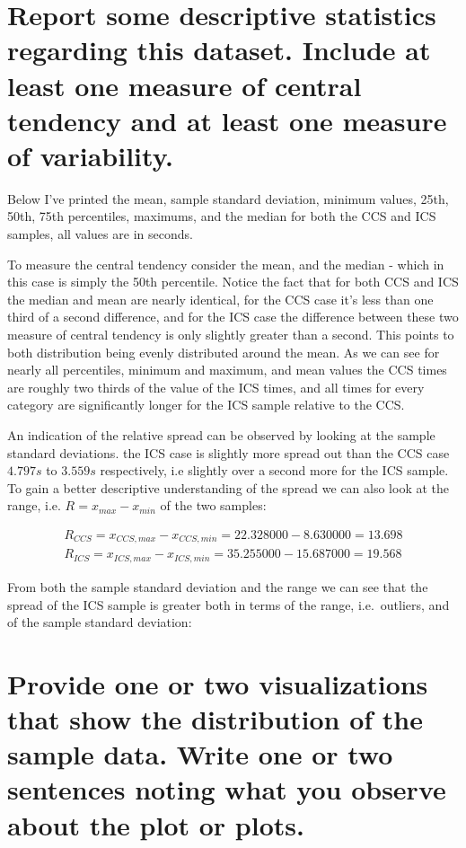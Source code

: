 \documentclass{article}
\begin{document}
\section{Report some descriptive statistics regarding this dataset.  Include at
least one measure of central tendency and at least one measure of variability.}
\label{sec:question3}
  Below I've printed the mean, sample standard deviation, minimum values,
25th, 50th, 75th percentiles, maximums, and the median for both the CCS
and ICS samples, all values are in seconds. 
\begin{center}
  
\end{center}
To measure the central tendency consider the mean, and the median - which in this
case is simply the 50th percentile. Notice the fact that for both CCS and ICS
the median and mean are nearly identical, for the CCS case it's less than one
third of a second difference, and for the ICS case the difference between these
two measure of central tendency is only slightly greater than a second. This
points to both distribution being evenly distributed around the mean. As we can
see for nearly all percentiles, minimum and maximum, and mean values the CCS
times are roughly two thirds of the value of the ICS times, and all times for
every category are significantly longer for the ICS sample relative to the CCS.

An indication of the relative spread can be observed by looking at the sample
standard deviations. the ICS case is slightly more spread out than the CCS case
\(4.797s\) to \(3.559s\) respectively, i.e slightly over a second more for the
ICS sample. To gain a better descriptive understanding of the spread we can also
look at the range, i.e.  \(R = x_{max} - x_{min}\) of the two samples:

\begin{align*}
R_{CCS} = x_{CCS,max} - x_{CCS,min} = 22.328000 - 8.630000 = 13.698\\
R_{ICS} = x_{ICS,max} - x_{ICS,min} = 35.255000 - 15.687000 = 19.568
\end{align*}

From both the sample standard deviation and the range we can see that the spread
of the ICS sample is greater both in terms of the range, i.e.~outliers, and of
the sample standard deviation:

\section{Provide one or two visualizations that show the distribution of
the sample data. Write one or two sentences noting what you observe
about the plot or
plots.}
\label{question4}
\end{document}
